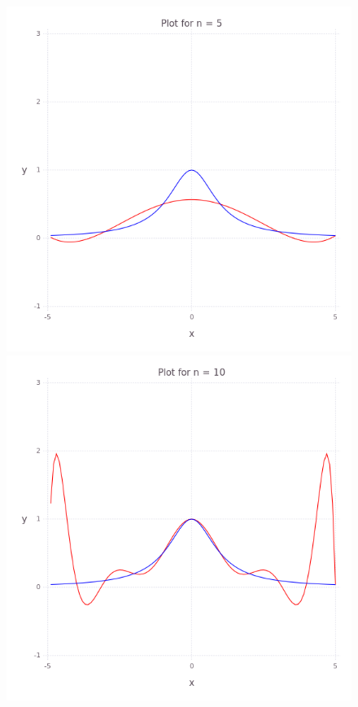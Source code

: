 \begin{figure}
    \begin{multicols}{2}
        \includegraphics[width=\linewidth]{../task-6/plots/myplot-1x2-5.png}\par 
        \includegraphics[width=\linewidth]{../task-6/plots/myplot-1x2-10.png}\par           

\end{multicols}
\end{figure}
